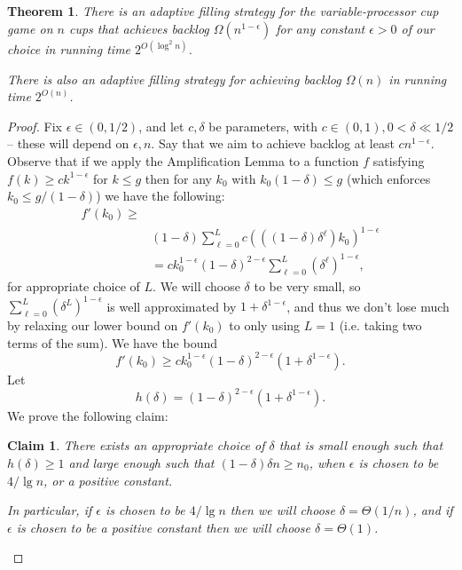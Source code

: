 \documentclass[twocolumn]{article}[10pt]
\newtheorem{clm}{Claim}
\newtheorem{theorem}{Theorem}
\begin{document}
\begin{theorem}
  \label{thm:adaptivePoly}
  There is an adaptive filling strategy for the variable-processor cup game on
  $n$ cups that achieves backlog $\Omega(n^{1-\epsilon})$ for any constant
  $\epsilon > 0$ of our choice in running time $2^{O(\log^2 n)}$.

  There is also an adaptive filling strategy for achieving backlog $\Omega(n)$ in running time $2^{O(n)}$.
\end{theorem}
\begin{proof}
  Fix $\epsilon \in (0,1/2)$, and let $c, \delta$ be parameters, with $c\in
  (0,1), 0 < \delta \ll 1/2$ -- these will depend on $\epsilon, n$.
  Say that we aim to achieve backlog at least $cn^{1-\epsilon}$.
  Observe that if we apply the Amplification Lemma to a function $f$ satisfying
  $f(k) \ge ck^{1-\epsilon}$ for $k \le g$ then for any $k_0$ with
  $k_0(1-\delta)\le g$ (which enforces $k_0 \le g/ (1-\delta)$) we have the
  following:
  \begin{align*}
  f'(k_0)\ge&\\
  &(1-\delta)\sum_{\ell=0}^L c (((1-\delta)\delta^\ell)k_0)^{1-\epsilon}\\
  &= ck_0^{1-\epsilon} (1-\delta)^{2-\epsilon} \sum_{\ell=0}^L (\delta^\ell)^{1-\epsilon},
  \end{align*}
  for appropriate choice of $L$.
  We will choose $\delta$ to be very small, so $\sum_{\ell=0}^L
  (\delta^L)^{1-\epsilon}$ is well approximated by
  $1+\delta^{1-\epsilon}$, and thus we don't lose much by relaxing our lower
  bound on $f'(k_0)$ to only using $L=1$ (i.e. taking two terms of the sum). We have the bound
  $$f'(k_0) \ge ck_0^{1-\epsilon}(1-\delta)^{2-\epsilon}(1+\delta^{1-\epsilon}).$$
  Let 
  $$h(\delta) = (1-\delta)^{2-\epsilon}(1+\delta^{1-\epsilon}).$$
  We prove the following claim:

  \begin{clm}
    \label{clm:validchoices}
    There exists an appropriate choice of $\delta$ that is small enough such
    that $h(\delta) \ge 1$ and large enough such that $(1-\delta)\delta n \ge
    n_0$, when $\epsilon$ is chosen to be $4/\lg n$, or a positive constant. 

    In particular, if $\epsilon$ is chosen to be $4/\lg n$ then we will choose
    $\delta =\Theta(1/n)$, and if $\epsilon$ is chosen to be a positive
    constant then we will choose $\delta = \Theta(1)$.
  \end{clm}


\end{proof}
\end{document}

